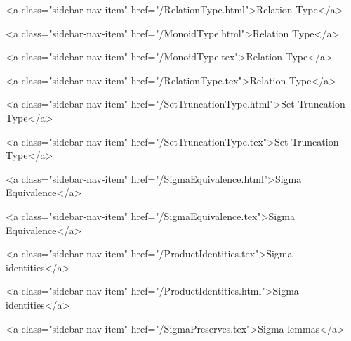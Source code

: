       
    
      
        
          <a class="sidebar-nav-item" href="/RelationType.html">Relation Type</a>
        
      
    
      
        
          <a class="sidebar-nav-item" href="/MonoidType.html">Relation Type</a>
        
      
    
      
        
          <a class="sidebar-nav-item" href="/MonoidType.tex">Relation Type</a>
        
      
    
      
        
          <a class="sidebar-nav-item" href="/RelationType.tex">Relation Type</a>
        
      
    
      
        
          <a class="sidebar-nav-item" href="/SetTruncationType.html">Set Truncation Type</a>
        
      
    
      
        
          <a class="sidebar-nav-item" href="/SetTruncationType.tex">Set Truncation Type</a>
        
      
    
      
        
          <a class="sidebar-nav-item" href="/SigmaEquivalence.html">Sigma Equivalence</a>
        
      
    
      
        
          <a class="sidebar-nav-item" href="/SigmaEquivalence.tex">Sigma Equivalence</a>
        
      
    
      
        
          <a class="sidebar-nav-item" href="/ProductIdentities.tex">Sigma identities</a>
        
      
    
      
        
          <a class="sidebar-nav-item" href="/ProductIdentities.html">Sigma identities</a>
        
      
    
      
        
          <a class="sidebar-nav-item" href="/SigmaPreserves.tex">Sigma lemmas</a>
        
